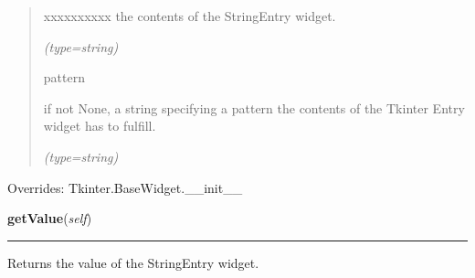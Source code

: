 \begin{boxedminipage}{\funcwidth}
\begin{quote}
\begin{Ventry}{xxxxxxxxxx}
          the contents of the StringEntry widget.

            {\it (type=string)}

          \item[pattern]

          if not None, a string specifying a pattern the contents of the 
          Tkinter Entry widget has to fulfill.

            {\it (type=string)}

        \end{Ventry}

      \end{quote}

      Overrides: Tkinter.BaseWidget.\_\_init\_\_

    \end{boxedminipage}

    \label{nMOLDYN:GUI:Widgets:ComboStringEntry:getValue}

    \vspace{0.5ex}

\hspace{.8\funcindent}\begin{boxedminipage}{\funcwidth}

    \raggedright \textbf{getValue}(\textit{self})

    \vspace{-1.5ex}

    \rule{\textwidth}{0.5\fboxrule}
\setlength{\parskip}{2ex}
    Returns the value of the StringEntry widget.

\setlength{\parskip}{1ex}
    \end{boxedminipage}

    \label{nMOLDYN:GUI:Widgets:ComboStringEntry:setValue}

    \vspace{0.5ex}

